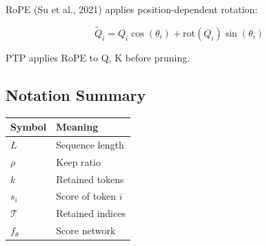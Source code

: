 RoPE (Su et al., 2021) applies position-dependent rotation:

\[
\tilde{Q}_i = Q_i \cos(\theta_i) + \text{rot}(Q_i) \sin(\theta_i)
\tag{3.8}
\]

PTP applies RoPE to Q, K before pruning.

\subsection{Notation Summary}

\begin{table}[H]
\centering
\small
\begin{tabular}{ll}
\toprule
\textbf{Symbol} & \textbf{Meaning} \\
\midrule
$L$ & Sequence length \\
$\rho$ & Keep ratio \\
$k$ & Retained tokens \\
$s_i$ & Score of token $i$ \\
$\mathcal{T}$ & Retained indices \\
$f_\theta$ & Score network \\
\bottomrule
\end{tabular}
\end{table}

